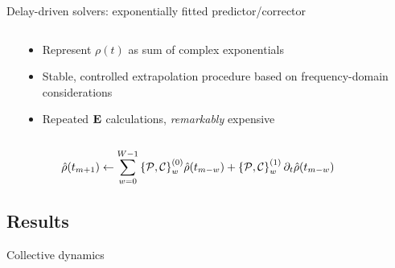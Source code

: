\documentclass[aspectratio=169, usenames, dvipsnames]{beamer}
\begin{document}
\begin{frame}{Delay-driven solvers: exponentially fitted predictor/corrector}
  \vspace{0.5cm}
  \begin{columns}
    \begin{column}{0.55\textwidth}
      
    \end{column}
    \begin{column}{0.45\textwidth}
      \begin{itemize}
        \item Represent $\rho(t)$ as sum of complex exponentials
        \item Stable, controlled extrapolation procedure based on frequency-domain considerations
        \item Repeated $\vb{E}$ calculations, \emph{remarkably} expensive
      \end{itemize}
    \end{column}
  \end{columns}
  \begin{equation*}
    \hat{\rho}(t_{m + 1}) \leftarrow \sum_{w = 0}^{W - 1} \qty{\mathcal{P}, \mathcal{C}}_w^\qty(0) \hat{\rho}(t_{m-w}) + \qty{\mathcal{P}, \mathcal{C}}_w^\qty(1) \, \partial_t \hat{\rho}(t_{m - w}) \qquad
  \end{equation*}
\end{frame}

\subsection{Results}

\begin{frame}{Collective dynamics}
  \begin{center}
    
  \end{center}
\end{frame}
\end{document}

